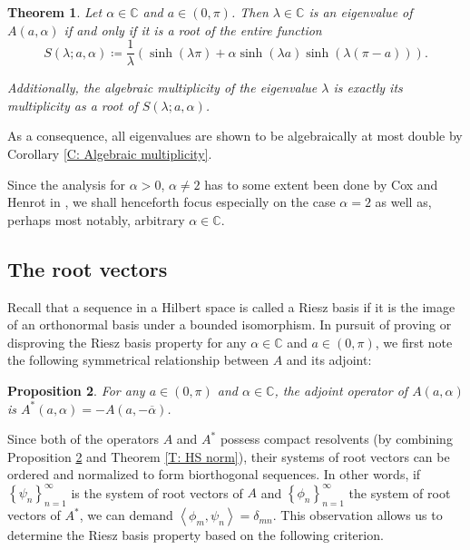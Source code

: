 \documentclass[11pt, a4paper,reqno]{amsart}
\theoremstyle{plain}
\newtheorem{theorem}{{Theorem}}[section]
\newtheorem{proposition}[theorem]{Proposition}
\theoremstyle{definition}
\theoremstyle{remark}
\newcommand{\inner}[2]{\left\langle{#1}, {#2}\right\rangle}
\newcommand{\seq}[1]{\left\{#1_n\right\}_{n = 1}^{\infty}}
\newcommand{\1}{\mathds 1}
\begin{document}
\begin{theorem}\label{CharacteristicFunction}
    Let $\alpha \in \mathbb C$ and $a \in (0,\pi)$. Then $\lambda \in \mathbb C$ is an eigenvalue of $A(a, \alpha)$ if and only if it is a root of the entire function
    \begin{equation}
    S(\lambda; a, \alpha) \coloneqq \frac{1}{\lambda}\left(\sinh(\lambda\pi) + \alpha \sinh(\lambda a)\sinh(\lambda(\pi-a))\right).
        \label{DefinitionOfS}
    \end{equation}

    Additionally, the algebraic multiplicity of the eigenvalue $\lambda$ is exactly its multiplicity as a root of $S(\lambda; a, \alpha)$.
\end{theorem}
As a consequence, all eigenvalues are shown to be algebraically at most double by Corollary \ref{C: Algebraic multiplicity}.


Since the analysis for $\alpha > 0$, $\alpha \neq 2$ has to some extent been done by Cox and Henrot in \cite{CH}, we shall henceforth focus especially on the case $\alpha = 2$ as well as, perhaps most notably, arbitrary $\alpha \in \mathbb C$.




\subsection{The root vectors}
Recall that a sequence in a Hilbert space is called a Riesz basis if it is the image of an orthonormal basis under a bounded isomorphism. In pursuit of proving or disproving the Riesz basis property for any $\alpha \in \mathbb C$ and $a \in (0, \pi)$, we first note the following symmetrical relationship between $A$ and its adjoint:

\begin{proposition}\label{AdjointProposition}
    For any $a \in (0, \pi)$ and $\alpha \in \mathbb C$, the adjoint operator of $A(a, \alpha)$ is $A^\ast(a, \alpha) = -A(a, -\overline{\alpha})$.
\end{proposition}

Since both of the operators $A$ and $A^\ast$ possess compact resolvents (by combining Proposition \ref{AdjointProposition} and Theorem \ref{T: HS norm}), their systems of root vectors can be ordered and normalized to form biorthogonal sequences. In other words, if $\seq{\psi}$ is the system of root vectors of $A$ and $\seq{\phi}$ the system of root vectors of $A^\ast$, we can demand $\inner{\phi_m}{\psi_n} = \delta_{mn}$. This observation allows us to determine the Riesz basis property based on the following criterion.
\end{document}
